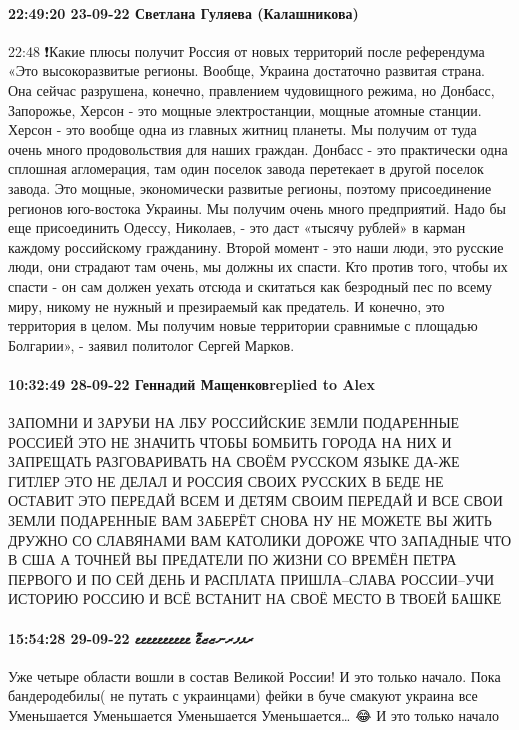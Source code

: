 \paragraph{22:49:20 23-09-22 Светлана Гуляева (Калашникова)}
22:48
❗️Какие плюсы получит Россия от новых территорий после референдума
«Это высокоразвитые регионы. Вообще, Украина достаточно развитая страна. Она сейчас разрушена, конечно, правлением чудовищного режима, но Донбасс, Запорожье, Херсон - это мощные электростанции, мощные атомные станции. Херсон - это вообще одна из главных житниц планеты. Мы получим от туда очень много продовольствия для наших граждан.
Донбасс - это практически одна сплошная агломерация, там один поселок завода перетекает в другой поселок завода. Это мощные, экономически развитые регионы, поэтому присоединение регионов юго-востока Украины. Мы получим очень много предприятий. Надо бы еще присоединить Одессу, Николаев, - это даст «тысячу рублей» в карман каждому российскому гражданину.
Второй момент - это наши люди, это русские люди, они страдают там очень, мы должны их спасти. Кто против того, чтобы их спасти - он сам должен уехать отсюда и скитаться как безродный пес по всему миру, никому не нужный и презираемый как предатель.
И конечно, это территория в целом. Мы получим новые территории сравнимые с площадью Болгарии», - заявил политолог Сергей Марков.

\paragraph{10:32:49 28-09-22 Геннадий Мащенковreplied to Alex}

ЗАПОМНИ И ЗАРУБИ НА ЛБУ РОССИЙСКИЕ ЗЕМЛИ ПОДАРЕННЫЕ РОССИЕЙ ЭТО НЕ ЗНАЧИТЬ
ЧТОБЫ БОМБИТЬ ГОРОДА НА НИХ И ЗАПРЕЩАТЬ РАЗГОВАРИВАТЬ НА СВОЁМ РУССКОМ ЯЗЫКЕ
ДА-ЖЕ ГИТЛЕР ЭТО НЕ ДЕЛАЛ И РОССИЯ СВОИХ РУССКИХ В БЕДЕ НЕ ОСТАВИТ ЭТО ПЕРЕДАЙ
ВСЕМ И ДЕТЯМ СВОИМ ПЕРЕДАЙ И ВСЕ СВОИ ЗЕМЛИ ПОДАРЕННЫЕ ВАМ ЗАБЕРЁТ СНОВА НУ НЕ
МОЖЕТЕ ВЫ ЖИТЬ ДРУЖНО СО СЛАВЯНАМИ ВАМ КАТОЛИКИ ДОРОЖЕ ЧТО ЗАПАДНЫЕ ЧТО В США А
ТОЧНЕЙ ВЫ ПРЕДАТЕЛИ ПО ЖИЗНИ СО ВРЕМЁН ПЕТРА ПЕРВОГО И ПО СЕЙ ДЕНЬ И РАСПЛАТА
ПРИШЛА--СЛАВА РОССИИ--УЧИ ИСТОРИЮ РОССИЮ И ВСЁ ВСТАНИТ НА СВОЁ МЕСТО В ТВОЕЙ
БАШКЕ

\paragraph{15:54:28 29-09-22 ރޕފރނޒޒޱޮ ޱޱޱޱޱޱޱޱޱޱ}

Уже четыре области вошли в состав Великой России!
И это только начало.
Пока бандеродебилы( не путать с украинцами) фейки в буче смакуют украина все
Уменьшается
Уменьшается
Уменьшается
Уменьшается…
😂
И это только начало👏


